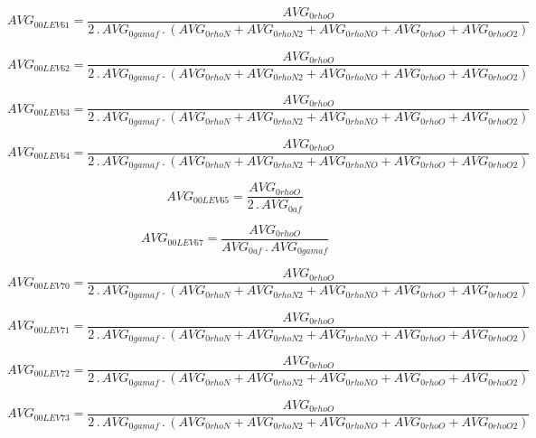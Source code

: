 \documentclass{article}
\begin{document}
\begin{dmath}AVG_{0 0 LEV 61} = \frac{AVG_{0 rhoO}}{2 \,.\, AVG_{0 gamaf} \,.\, \left(AVG_{0 rhoN} + AVG_{0 rhoN2} + AVG_{0 rhoNO} + AVG_{0 rhoO} + AVG_{0 rhoO2}\right)}\end{dmath}

\begin{dmath}AVG_{0 0 LEV 62} = \frac{AVG_{0 rhoO}}{2 \,.\, AVG_{0 gamaf} \,.\, \left(AVG_{0 rhoN} + AVG_{0 rhoN2} + AVG_{0 rhoNO} + AVG_{0 rhoO} + AVG_{0 rhoO2}\right)}\end{dmath}

\begin{dmath}AVG_{0 0 LEV 63} = \frac{AVG_{0 rhoO}}{2 \,.\, AVG_{0 gamaf} \,.\, \left(AVG_{0 rhoN} + AVG_{0 rhoN2} + AVG_{0 rhoNO} + AVG_{0 rhoO} + AVG_{0 rhoO2}\right)}\end{dmath}

\begin{dmath}AVG_{0 0 LEV 64} = \frac{AVG_{0 rhoO}}{2 \,.\, AVG_{0 gamaf} \,.\, \left(AVG_{0 rhoN} + AVG_{0 rhoN2} + AVG_{0 rhoNO} + AVG_{0 rhoO} + AVG_{0 rhoO2}\right)}\end{dmath}

\begin{dmath}AVG_{0 0 LEV 65} = \frac{AVG_{0 rhoO}}{2 \,.\, AVG_{0 af}}\end{dmath}

\begin{dmath}AVG_{0 0 LEV 67} = \frac{AVG_{0 rhoO}}{AVG_{0 af} \,.\, AVG_{0 gamaf}}\end{dmath}

\begin{dmath}AVG_{0 0 LEV 70} = \frac{AVG_{0 rhoO}}{2 \,.\, AVG_{0 gamaf} \,.\, \left(AVG_{0 rhoN} + AVG_{0 rhoN2} + AVG_{0 rhoNO} + AVG_{0 rhoO} + AVG_{0 rhoO2}\right)}\end{dmath}

\begin{dmath}AVG_{0 0 LEV 71} = \frac{AVG_{0 rhoO}}{2 \,.\, AVG_{0 gamaf} \,.\, \left(AVG_{0 rhoN} + AVG_{0 rhoN2} + AVG_{0 rhoNO} + AVG_{0 rhoO} + AVG_{0 rhoO2}\right)}\end{dmath}

\begin{dmath}AVG_{0 0 LEV 72} = \frac{AVG_{0 rhoO}}{2 \,.\, AVG_{0 gamaf} \,.\, \left(AVG_{0 rhoN} + AVG_{0 rhoN2} + AVG_{0 rhoNO} + AVG_{0 rhoO} + AVG_{0 rhoO2}\right)}\end{dmath}

\begin{dmath}AVG_{0 0 LEV 73} = \frac{AVG_{0 rhoO}}{2 \,.\, AVG_{0 gamaf} \,.\, \left(AVG_{0 rhoN} + AVG_{0 rhoN2} + AVG_{0 rhoNO} + AVG_{0 rhoO} + AVG_{0 rhoO2}\right)}\end{dmath}
\end{document}
